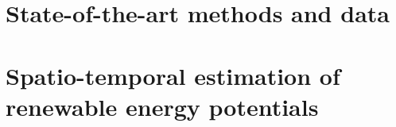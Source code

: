 %
%
%






\setlength{\parindent}{0pt}
\setlength{\parskip}{0pt} %
\setlength{\textfloatsep}{10pt plus 1.0pt minus 2.0pt}
\renewcommand{\arraystretch}{1.2} %
\frontmatter

% 
\setcounter{page}{0}
% 
% 
% 

\cleardoublepage
{}
\tableofcontents

\cleardoublepage
{}
{} %
\listoffigures
% 
\cleardoublepage
{}
{} %
\listoftables

\cleardoublepage
{}
{} %


\setlength{\parskip}{1em}


\nobibliography*
\mainmatter

\cleardoublepage

\part{State-of-the-art methods and data}
\label{methods}

\cleardoublepage

\cleardoublepage

\cleardoublepage

\part{Spatio-temporal estimation of renewable energy potentials}
\label{potential}

\cleardoublepage

\cleardoublepage

